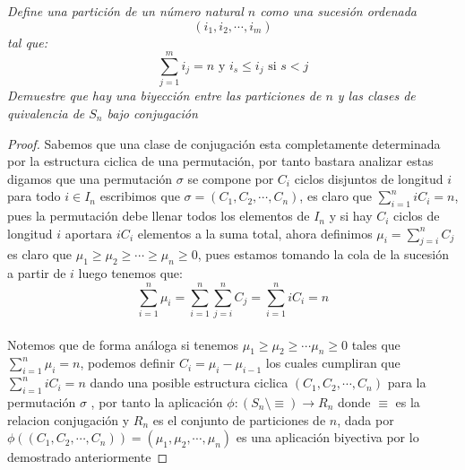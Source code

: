 \documentclass[11pt,letterpaper]{article}
\begin{document}
\begin{tcolorbox}[
	title = \textcolor{black}{\textcolor{white}{Problema 7}},]
\textit{Define una partici\'on de un n\'umero natural $n$ como una sucesi\'on ordenada
\begin{equation*}
    (i_1,i_2,\cdots,i_m)
\end{equation*}
tal que:
\begin{equation*}
    \sum_{j=1}^m i_j=n\,\,\text{y}\,\,i_s\leq i_j\,\,\text{si}\,\,s<j
\end{equation*}
Demuestre que hay una biyecci\'on entre las particiones de $n$ y las clases de quivalencia de $S_n$ bajo conjugaci\'on 
}
\end{tcolorbox}
\begin{proof}
    Sabemos que una clase de conjugaci\'on esta completamente determinada por la estructura ciclica de una permutaci\'on, por tanto bastara analizar estas
    digamos que una permutaci\'on $\sigma$ se compone por $C_i$ ciclos disjuntos de longitud $i$ para todo $i\in I_n$ escribimos que $\sigma=(C_1,C_2,\cdots,C_n)$, es claro que
    $\sum_{i=1}^niC_i=n$, pues la permutaci\'on debe llenar todos los elementos de $I_n$ y si hay $C_i$ ciclos de longitud $i$ aportara $iC_i$ elementos a la suma total, ahora definimos
    $\mu_i=\sum_{j=i}^nC_j$ es claro que $\mu_1\geq \mu_2\geq\cdots \geq \mu_n\geq 0$, pues estamos tomando la cola de la sucesi\'on a partir de $i$ luego tenemos que:
    \begin{equation*}
        \sum_{i=1}^n \mu_i=\sum_{i=1}^n \sum_{j=i}^n C_j=\sum_{i=1}^niC_i=n
    \end{equation*}\,\\
    Notemos que de forma an\'aloga si tenemos $\mu_1\geq\mu_2\geq\cdots\mu_n\geq 0$ tales que 
    $\sum_{i=1}^{n}\mu_i=n$, podemos definir $C_i=\mu_i-\mu_{i-1}$ los cuales cumpliran que $\sum_{i=1}^niC_i=n$ dando una posible estructura ciclica $(C_1,C_2,\cdots,C_n)$ para la permutaci\'on $\sigma$ , por tanto la
    aplicaci\'on $\phi:(S_n\setminus \equiv)\to R_n$ donde $\equiv$ es la relacion conjugaci\'on y $R_n$ es el conjunto de particiones de $n$, dada por $\phi((C_1,C_2,\cdots,C_n))=(\mu_1,\mu_2,\cdots,\mu_n)$ es una aplicaci\'on
    biyectiva por lo demostrado anteriormente
\end{proof}
\end{document}
